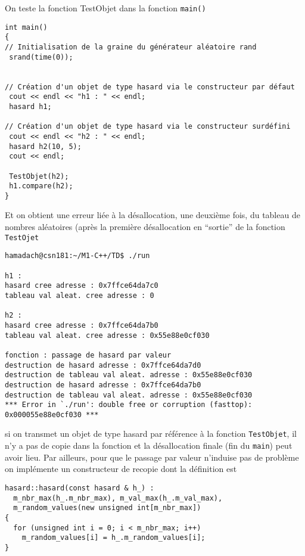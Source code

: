 \documentclass{book}
\begin{document}
\begin{correction}
On teste la fonction TestObjet dans la fonction \texttt{main()}

\begin{verbatim}
int main()
{
// Initialisation de la graine du générateur aléatoire rand
 srand(time(0));

  
// Création d'un objet de type hasard via le constructeur par défaut
 cout << endl << "h1 : " << endl;
 hasard h1;

// Création d'un objet de type hasard via le constructeur surdéfini
 cout << endl << "h2 : " << endl;
 hasard h2(10, 5);
 cout << endl;

 TestObjet(h2);
 h1.compare(h2);
}
\end{verbatim}

Et on obtient une erreur liée à la désallocation, une deuxième fois, du tableau de nombres aléatoires
(après la première désallocation en ``sortie'' de la fonction \texttt{TestOjet}

\begin{verbatim}
hamadach@csn181:~/M1-C++/TD$ ./run
  
h1 : 
hasard cree adresse : 0x7ffce64da7c0
tableau val aleat. cree adresse : 0

h2 : 
hasard cree adresse : 0x7ffce64da7b0
tableau val aleat. cree adresse : 0x55e88e0cf030

fonction : passage de hasard par valeur
destruction de hasard adresse : 0x7ffce64da7d0
destruction de tableau val aleat. adresse : 0x55e88e0cf030
destruction de hasard adresse : 0x7ffce64da7b0
destruction de tableau val aleat. adresse : 0x55e88e0cf030
*** Error in `./run': double free or corruption (fasttop): 0x000055e88e0cf030 ***
\end{verbatim}

si on transmet un objet de type hasard par référence à la fonction \texttt{TestObjet}, il n'y a
pas de copie dans la fonction et la désallocation finale (fin du \texttt{main}) peut avoir lieu.
Par ailleurs, pour que le passage par valeur n'induise pas de problème on implémente un constructeur
de recopie dont la définition est

\begin{verbatim}
hasard::hasard(const hasard & h_) :
  m_nbr_max(h_.m_nbr_max), m_val_max(h_.m_val_max),
  m_random_values(new unsigned int[m_nbr_max])
{
  for (unsigned int i = 0; i < m_nbr_max; i++) 
    m_random_values[i] = h_.m_random_values[i];
}
\end{verbatim}


\end{correction}
\end{document}
